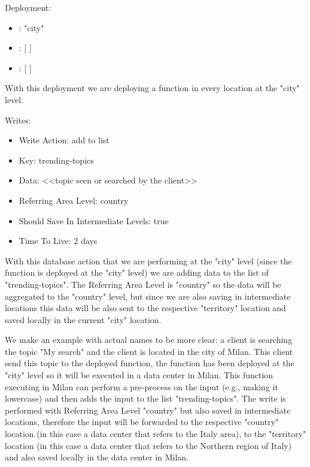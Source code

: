 \begin{example}
Deployment:
\begin{itemize}
    \item {}: "city"
    \item {}: [ ]
    \item {}: [ ]
\end{itemize}
With this deployment we are deploying a function in every location at the "city" level.

Writes:
\begin{itemize}
    \item Write Action: add to list
    \item Key: trending-topics
    \item Data: <<topic seen or searched by the client>>
    \item Referring Area Level: country
    \item Should Save In Intermediate Levels: true
    \item Time To Live: 2 days
\end{itemize}
With this database action that we are performing at the "city" level (since the function is deployed at the "city" level) we are adding data to the list of "trending-topics". The Referring Area Level is "country" so the data will be aggregated to the "country" level, but since we are also saving in intermediate locations this data will be also sent to the respective "territory" location and saved locally in the current "city" location.

We make an example with actual names to be more clear: a client is searching the topic "My search" and the client is located in the city of Milan. This client send this topic to the deployed function, the function has been deployed at the "city" level so it will be executed in a data center in Milan. This function executing in Milan can perform a pre-process on the input (e.g., making it lowercase) and then adds the input to the list "trending-topics". The write is performed with Referring Area Level "country" but also saved in intermediate locations, therefore the input will be forwarded to the respective "country" location (in this case a data center that refers to the Italy area), to the "territory" location (in this case a data center that refers to the Northern region of Italy) and also saved locally in the data center in Milan.
\end{example}

